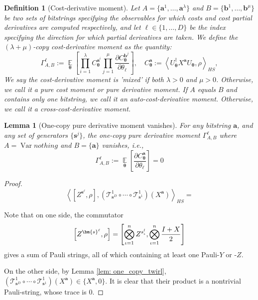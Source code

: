 \documentclass[a4paper,onecolumn,notitlepage,nofootinbib,longbibliography,superscriptaddress, floatfix, pra, aps, 10pt]{revtex4-2}
\newcommand{\inner}[2]{\left\langle #1, #2 \right\rangle}
\newcommand{\vttheta}{{\bm{\theta}}}
\newcommand{\vta}{{\bm{a}}}
\newcommand{\vtb}{{\bm{b}}}
\newcommand{\vtsj}{{\bm{s}^j}}
\newcommand{\vtsl}{{\bm{s}^\ell}}
\newcommand{\vts}{{\bm{s}}}
\newtheorem{lemma}{Lemma}
\newtheorem{definition}{Definition}
\begin{document}
\begin{definition}[Cost-derivative moment]
Let $A = \{\vta^1,\dots,\vta^\lambda\}$ and $B = \{\vtb^1,\dots,\vtb^\mu\}$ be two sets of bitstrings specifying the observables for which costs and cost partial derivatives are computed respectively, and let $\ell \in \{1,\dots,D\}$ be the index specifying the direction for which partial derivatives are taken. We define the $(\lambda + \mu)$-copy cost-derivative moment as the quantity:
\begin{equation}
    \Gamma_{A,B}^{\ell} := \operatorname*{\mathbb{E}}_{\vttheta}\left[
        \prod_{i=1}^{\lambda} C^{\vta^i}_\vttheta
        \prod_{j=1}^{\mu}
        \frac{\partial C^{\vtb^j}_\vttheta}{\partial \theta_{\ell}}
    \right], \quad 
    C^\vta_\vttheta := 
    \inner{U_\vttheta^\dagger X^{\vta}U_\vttheta}{\rho }_{HS}, 
\end{equation}
We say the cost-derivative moment is 'mixed' if both $\lambda > 0$ and $\mu>0$. Otherwise, we call it a pure cost moment or pure derivative moment. If $A$ equals $B$ and contains only one bitstring, we call it an auto-cost-derivative moment. Otherwise, we call it a cross-cost-derivative moment.
\end{definition}

\begin{lemma}[One-copy pure derivative moment vanishes]
\label{lem: first moment vanish}
For any bitstring $\vta$, and any set of generators $\{\vtsj\}$, the 
one-copy pure derivative moment $ \Gamma_{A,B}^{\ell}$ where $A=\operatorname*{Var}nothing$ and $B=\{\vta\}$ vanishes, i.e.,
\begin{equation}
\Gamma_{A,B}^{\ell}:= \operatorname*{\mathbb{E}}_\vttheta\left[ \frac{\partial C_\vttheta^\vta}{\partial \theta_\ell} \right]=0
\end{equation}
\end{lemma}
\begin{proof}
\begin{equation}
\inner{\left[Z^\vtsl,\rho\right]}{
\left(\mathcal{T}^1_{\vts^D}\circ\cdots\circ\mathcal{T}^1_{\vts^1} \right)(X^\vta)}_{HS} =     
\end{equation}

Note that on one side, the commutator \begin{equation}\left[Z^\vtsl,\rho\right] = \comm{\bigotimes_{\iota=1}^n Z^{s^l_\iota}} {\bigotimes_{\iota=1}^n\frac{I+X}{2}}\end{equation} gives a sum of Pauli strings, all of which containing at least one Pauli-$Y$ or -$Z$. 

On the other side, by Lemma \ref{lem: one_copy_twirl}, $\left(\mathcal{T}^1_{\vts^D}\circ\cdots\circ\mathcal{T}^1_{\vts^1}\right)(X^\vta)  \in \{X^\vta,0\}$. It is clear that their product is a nontrivial Pauli-string, whose trace is $0$. 
\end{proof}
\end{document}
